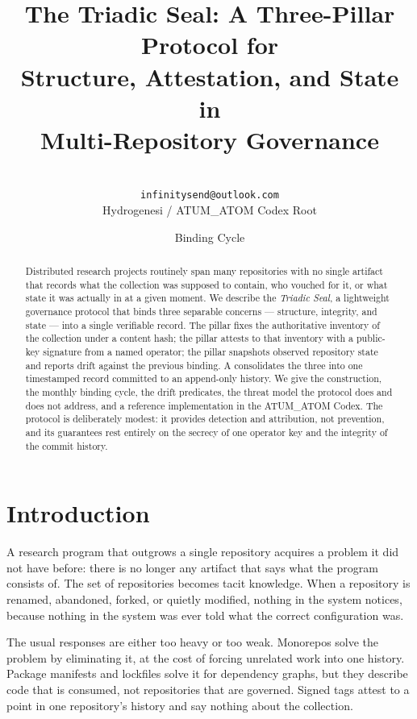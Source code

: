\documentclass[11pt,a4paper]{article}
\title{The Triadic Seal: A Three-Pillar Protocol for\\
       Structure, Attestation, and State in\\
       Multi-Repository Governance}
\author{\atumoperator\\
        \texttt{infinitysend@outlook.com}\\
        \small Hydrogenesi / ATUM\_ATOM Codex Root}
\date{Binding Cycle \bindingcycle}
\begin{document}
\maketitle

\begin{abstract}
Distributed research projects routinely span many repositories with no
single artifact that records what the collection was supposed to contain,
who vouched for it, or what state it was actually in at a given moment.
We describe the \emph{Triadic Seal}, a lightweight governance protocol that
binds three separable concerns --- structure, integrity, and state --- into a
single verifiable record. The \Manifest{} pillar fixes the authoritative
inventory of the collection under a content hash; the \Signature{} pillar
attests to that inventory with a public-key signature from a named operator;
the \Seal{} pillar snapshots observed repository state and reports drift
against the previous binding. A \MetaSeal{} consolidates the three into one
timestamped record committed to an append-only history. We give the
construction, the monthly binding cycle, the drift predicates, the threat
model the protocol does and does not address, and a reference implementation
in the ATUM\_ATOM Codex. The protocol is deliberately modest: it provides
detection and attribution, not prevention, and its guarantees rest entirely
on the secrecy of one operator key and the integrity of the commit history.
\end{abstract}

\tableofcontents

\section{Introduction}

A research program that outgrows a single repository acquires a problem it
did not have before: there is no longer any artifact that says what the
program consists of. The set of repositories becomes tacit knowledge. When a
repository is renamed, abandoned, forked, or quietly modified, nothing in the
system notices, because nothing in the system was ever told what the correct
configuration was.

The usual responses are either too heavy or too weak. Monorepos solve the
problem by eliminating it, at the cost of forcing unrelated work into one
history. Package manifests and lockfiles solve it for dependency graphs, but
they describe code that is consumed, not repositories that are governed.
Signed tags attest to a point in one repository's history and say nothing
about the collection.
\end{document}
